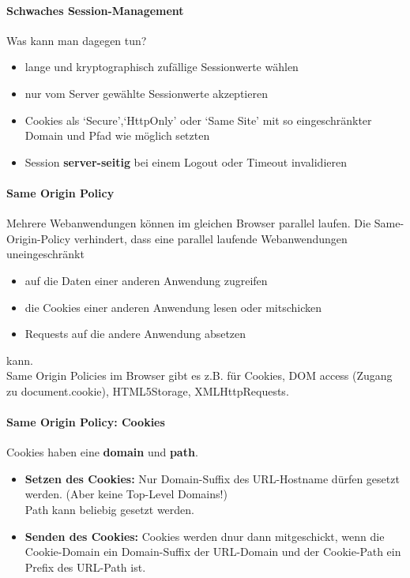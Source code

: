 \documentclass[10pt,a4paper]{article}
\begin{document}
\paragraph*{Schwaches Session-Management}Was kann man dagegen tun?
\begin{itemize}[noitemsep,topsep=0pt,leftmargin=*]
    \item lange und kryptographisch zufällige Sessionwerte wählen
    \item nur vom Server gewählte Sessionwerte akzeptieren
    \item Cookies als `Secure',`HttpOnly' oder `Same Site' mit so eingeschränkter Domain und Pfad wie möglich setzten
    \item Session \textbf{server-seitig} bei einem Logout oder Timeout invalidieren
\end{itemize}

\paragraph*{Same Origin Policy}Mehrere Webanwendungen können im gleichen Browser parallel laufen. Die Same-Origin-Policy verhindert, dass eine parallel laufende Webanwendungen uneingeschränkt
\begin{itemize}[noitemsep,topsep=0pt,leftmargin=*]
    \item auf die Daten einer anderen Anwendung zugreifen
    \item die Cookies einer anderen Anwendung lesen oder mitschicken
    \item Requests auf die andere Anwendung absetzen
\end{itemize} kann.\\
Same Origin Policies im Browser gibt es z.B. für Cookies, DOM access (Zugang zu document.cookie), HTML5Storage, XMLHttpRequests.

\paragraph*{Same Origin Policy: Cookies} Cookies haben eine \textbf{domain} und \textbf{path}.
\begin{itemize}[noitemsep,topsep=0pt,leftmargin=*]
    \item \textbf{Setzen des Cookies:} Nur Domain-Suffix des URL-Hostname dürfen gesetzt werden. (Aber keine Top-Level Domains!)\\
    Path kann beliebig gesetzt werden.
    \item \textbf{Senden des Cookies:} Cookies werden dnur dann mitgeschickt, wenn die Cookie-Domain ein Domain-Suffix der URL-Domain und der Cookie-Path ein Prefix des URL-Path ist.
\end{itemize}
\end{document}

